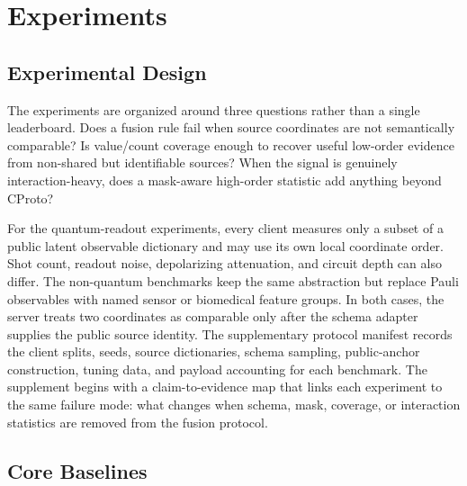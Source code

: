 \section{Experiments}
\label{sec:experiments}

\subsection{Experimental Design}

The experiments are organized around three questions rather than a single leaderboard. Does a fusion rule fail when source coordinates are not semantically comparable? Is value/count coverage enough to recover useful low-order evidence from non-shared but identifiable sources? When the signal is genuinely interaction-heavy, does a mask-aware high-order statistic add anything beyond CProto?

For the quantum-readout experiments, every client measures only a subset of a public latent observable dictionary and may use its own local coordinate order. Shot count, readout noise, depolarizing attenuation, and circuit depth can also differ. The non-quantum benchmarks keep the same abstraction but replace Pauli observables with named sensor or biomedical feature groups. In both cases, the server treats two coordinates as comparable only after the schema adapter supplies the public source identity. The supplementary protocol manifest records the client splits, seeds, source dictionaries, schema sampling, public-anchor construction, tuning data, and payload accounting for each benchmark.
The supplement begins with a claim-to-evidence map that links each experiment to the same failure mode: what changes when schema, mask, coverage, or interaction statistics are removed from the fusion protocol.

\subsection{Core Baselines}

